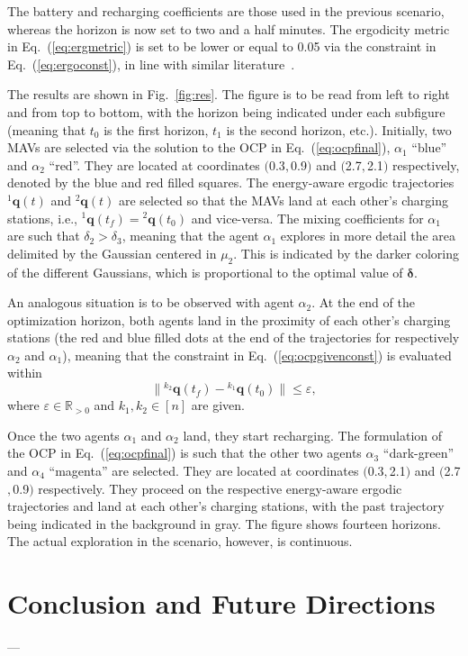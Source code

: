 \documentclass[lettersize,journal,twoside]{IEEEtran}
\theoremstyle{definition}
\begin{document}
The battery and recharging coefficients are those used in the previous scenario, whereas the horizon is now set to two and a half minutes.
The ergodicity metric in Eq.~(\ref{eq:ergmetric}) is set to be lower or equal to 0.05 via the constraint in Eq.~(\ref{eq:ergoconst}), in line with similar literature~\cite{dong2023time}.

The results are shown in Fig.~\ref{fig:res}. The figure is to be read from left to right and from top to bottom, with the horizon being indicated under each subfigure (meaning that $t_0$ is the first horizon, $t_1$ is the second horizon, etc.). Initially, two MAVs are selected via the solution to the OCP in Eq.~(\ref{eq:ocpfinal}), $\alpha_1$ ``blue'' and $\alpha_2$ ``red''. They are located at coordinates $($0.3$,$0.9$)$ and $($2.7$,$2.1$)$ respectively, denoted by the blue and red filled squares. The energy-aware ergodic trajectories ${}^1\mathbf{q}(t)$ and ${}^2\mathbf{q}(t)$ are selected so that the MAVs land at each other's charging stations, i.e., ${}^1\mathbf{q}(t_f)={}^2\mathbf{q}(t_0)$ and vice-versa. The mixing coefficients for $\alpha_1$ are such that $\delta_2>\delta_3$, meaning that the agent $\alpha_1$ explores in more detail the area delimited by the Gaussian centered in $\mu_2$. This is indicated by the darker coloring of the different Gaussians, which is proportional to the optimal value of $\boldsymbol{\delta}$. 

An analogous situation is to be observed with agent $\alpha_2$. At the end of the optimization horizon, both agents land in the proximity of each other's charging stations (the red and blue filled dots at the end of the trajectories for respectively $\alpha_2$ and $\alpha_1$), meaning that the constraint in Eq.~(\ref{eq:ocpgivenconst}) is evaluated within
\begin{equation}
  \lVert{}^{k_2}\mathbf{q}(t_f)-{}^{k_1}\mathbf{q}(t_0)\rVert\leq\varepsilon,
\end{equation} 
where $\varepsilon\in\mathbb{R}_{>0}$ and $k_1,k_2\in[n]$ are given.

Once the two agents $\alpha_1$ and $\alpha_2$ land, they start recharging. The formulation of the OCP in Eq.~(\ref{eq:ocpfinal}) is such that the other two agents $\alpha_3$ ``dark-green'' and $\alpha_4$ ``magenta'' are selected. They are located at coordinates $($0.3$,$2.1$)$ and $($2.7$,$0.9$)$ respectively. They proceed on the respective energy-aware ergodic trajectories and land at each other's charging stations, with the past trajectory being indicated in the background in gray. The figure shows fourteen horizons. The actual exploration in the scenario, however, is continuous.


\section{Conclusion and Future Directions}\label{sec:conc}
\noindent

---


{\small
 

}
\end{document}
